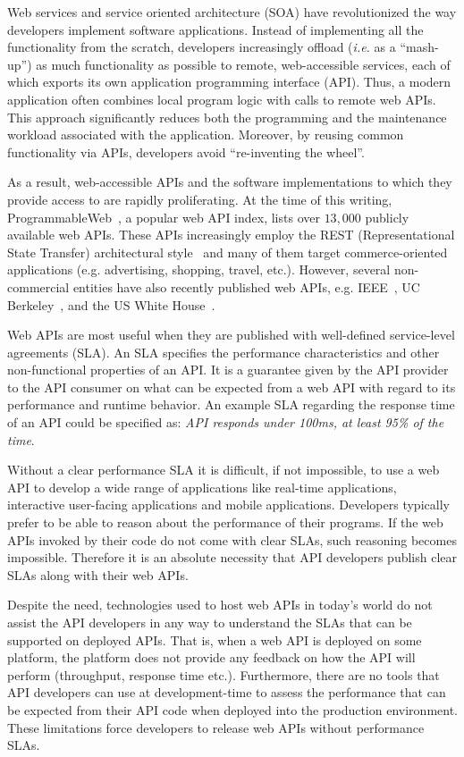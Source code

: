 Web services and service oriented architecture (SOA) have
revolutionized the way developers implement software applications.
Instead of implementing all the functionality from the scratch, developers
increasingly offload ({\em i.e.} as a ``mash-up'') as much functionality 
as possible to remote,
web-accessible services, each of which exports its own application programming
interface (API). Thus, a modern application often combines local program logic
with calls to remote web APIs.
This approach significantly reduces both the programming and
the maintenance workload associated with the application.
Moreover, by reusing common functionality via APIs, developers avoid ``re-inventing the
wheel''.

As a result, web-accessible APIs and the software implementations to which
they provide access to are rapidly proliferating.
At the time of this writing, 
ProgrammableWeb~\cite{pweb}, a popular web API index, lists over $13,000$
publicly available web APIs.
These APIs increasingly employ the REST (Representational State Transfer) architectural style~\cite{Fielding:2000:ASD:932295} and 
many of them target commerce-oriented applications (e.g. advertising, shopping, travel, etc.).
However, several non-commercial entities have also recently published web 
APIs, e.g. IEEE~\cite{ieeeapis}, UC Berkeley~\cite{ucbapis}, and the US White
House~\cite{whitehouseapis}. 

Web APIs are most useful when they are published with well-defined service-level agreements (SLA). 
An SLA specifies the performance characteristics and other non-functional 
properties of an API. It is a guarantee given by the API provider to the API consumer on what can be
expected from a web API with regard to its performance and runtime behavior. An example SLA regarding
the response time of an API could be specified as: \textit{API responds under 100ms, at least 95\% of the time}.

Without a clear performance SLA it is difficult, if not impossible,
to use a web API to develop a wide range of applications like real-time applications, interactive
user-facing applications and mobile applications.
Developers typically prefer to be able to reason about
the performance of their programs. If the web APIs invoked by their code do
not come with clear SLAs, such reasoning becomes impossible. Therefore it is an absolute
necessity that API developers publish clear SLAs along with their web APIs. 

Despite the need, technologies used to host web APIs in today's world do not assist the API
developers in any way to understand the SLAs that can be supported on deployed APIs. That is,
when a web API is deployed on some platform, the platform does not provide any feedback 
on how the API will perform (throughput, response time etc.). Furthermore,
there are no tools that API developers can use at development-time to assess the performance
that can be expected from their API code when deployed into the production environment.
These limitations force developers to release web APIs without performance SLAs.


